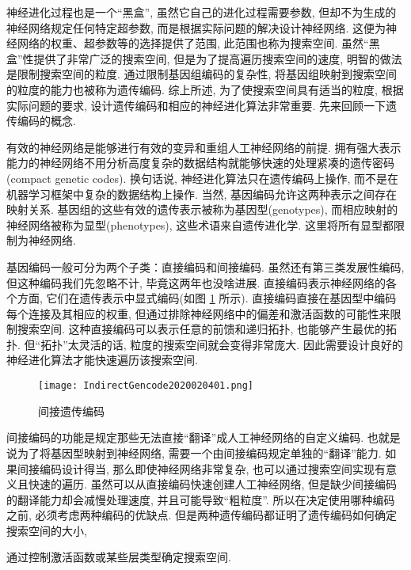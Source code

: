 \begin{remark}
神经进化过程也是一个“黑盒”, 虽然它自己的进化过程需要参数, 但却不为生成的神经网络规定任何特定超参数, 而是根据实际问题的解决设计神经网络.
这便为神经网络的权重、超参数等的选择提供了范围, 此范围也称为搜索空间. 虽然“黑盒”性提供了非常广泛的搜索空间, 但是为了提高遍历搜索空间的速度, 明智的做法是限制搜索空间的粒度.
通过限制基因组编码的复杂性, 将基因组映射到搜索空间的粒度的能力也被称为遗传编码.
综上所述, 为了使搜索空间具有适当的粒度, 根据实际问题的要求, 设计遗传编码和相应的神经进化算法非常重要. 先来回顾一下遗传编码的概念.

有效的神经网络是能够进行有效的变异和重组人工神经网络的前提. 拥有强大表示能力的神经网络不用分析高度复杂的数据结构就能够快速的处理紧凑的遗传密码(compact genetic codes).
换句话说, 神经进化算法只在遗传编码上操作, 而不是在机器学习框架中复杂的数据结构上操作.
当然, 基因编码允许这两种表示之间存在映射关系. 基因组的这些有效的遗传表示被称为基因型(genotypes), 而相应映射的神经网络被称为显型(phenotypes), 这些术语来自遗传进化学. 这里将所有显型都限制为神经网络.

基因编码一般可分为两个子类：直接编码和间接编码. 虽然还有第三类发展性编码, 但这种编码我们先忽略不计, 毕竟这两年也没啥进展.
直接编码表示神经网络的各个方面, 它们在遗传表示中显式编码(如图 \ref{IndirectGencode2020020401} 所示).
直接编码直接在基因型中编码每个连接及其相应的权重, 但通过排除神经网络中的偏差和激活函数的可能性来限制搜索空间.
这种直接编码可以表示任意的前馈和递归拓扑, 也能够产生最优的拓扑. 但“拓扑”太灵活的话, 粒度的搜索空间就会变得非常庞大.
因此需要设计良好的神经进化算法才能快速遍历该搜索空间.
\begin{figure}[H]
    \centering
    \texttt{[image: IndirectGencode2020020401.png]}
    \caption{间接遗传编码}
    \label{IndirectGencode2020020401}
\end{figure}

间接编码的功能是规定那些无法直接“翻译”成人工神经网络的自定义编码. 也就是说为了将基因型映射到神经网络, 需要一个由间接编码规定单独的“翻译”能力. 如果间接编码设计得当, 那么即使神经网络非常复杂, 也可以通过搜索空间实现有意义且快速的遍历.
虽然可以从直接编码快速创建人工神经网络, 但是缺少间接编码的翻译能力却会减慢处理速度, 并且可能导致“粗粒度”. 所以在决定使用哪种编码之前, 必须考虑两种编码的优缺点.
但是两种遗传编码都证明了遗传编码如何确定搜索空间的大小,
\begin{example}
    通过控制激活函数或某些层类型确定搜索空间.
\end{example}
\end{remark}

